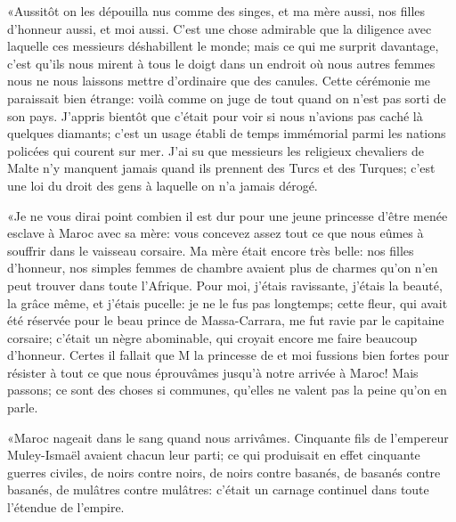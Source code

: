 «Aussitôt on les dépouilla nus comme des singes, et ma mère aussi, nos
filles d’honneur aussi, et moi aussi. C’est une chose admirable que la
diligence avec laquelle ces messieurs déshabillent le monde; mais ce
qui me surprit davantage, c’est qu’ils nous mirent à tous le doigt dans
un endroit où nous autres femmes nous ne nous laissons mettre
d’ordinaire que des canules. Cette cérémonie me paraissait bien
étrange: voilà comme on juge de tout quand on n’est pas sorti de son
pays. J’appris bientôt que c’était pour voir si nous n’avions pas caché
là quelques diamants; c’est un usage établi de temps immémorial parmi
les nations policées qui courent sur mer. J’ai su que messieurs les
religieux chevaliers de Malte n’y manquent jamais quand ils prennent
des Turcs et des Turques; c’est une loi du droit des gens à laquelle on
n’a jamais dérogé.

«Je ne vous dirai point combien il est dur pour une jeune princesse
d’être menée esclave à Maroc avec sa mère: vous concevez assez tout ce
que nous eûmes à souffrir dans le vaisseau corsaire. Ma mère était
encore très belle: nos filles d’honneur, nos simples femmes de chambre
avaient plus de charmes qu’on n’en peut trouver dans toute l’Afrique.
Pour moi, j’étais ravissante, j’étais la beauté, la grâce même, et
j’étais pucelle: je ne le fus pas longtemps; cette fleur, qui avait
été réservée pour le beau prince de Massa-Carrara, me fut ravie par le
capitaine corsaire; c’était un nègre abominable, qui croyait encore me
faire beaucoup d’honneur. Certes il fallait que M la princesse de
 et moi fussions bien fortes pour résister à tout ce que nous
éprouvâmes jusqu’à notre arrivée à Maroc! Mais passons; ce sont des
choses si communes, qu’elles ne valent pas la peine qu’on en parle.

«Maroc nageait dans le sang quand nous arrivâmes. Cinquante fils de
l’empereur Muley-Ismaël avaient chacun leur parti; ce qui produisait
en effet cinquante guerres civiles, de noirs contre noirs, de noirs
contre basanés, de basanés contre basanés, de mulâtres contre mulâtres:
c’était un carnage continuel dans toute l’étendue de l’empire.



